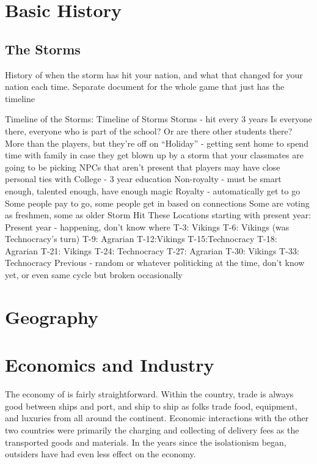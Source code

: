 \documentclass[blue]{GL2020}
\begin{document}
\name{\bVikings{}}

\section*{Basic History}

\subsection*{The Storms}
History of when the storm has hit your nation, and what that changed for your nation each time.
Separate document for the whole game that just has the timeline

Timeline of the Storms:
Timeline of Storms
Storms - hit every 3 years
Is everyone there, everyone who is part of the school?  Or are there other students there?
More than the players, but they’re off on “Holiday” - getting sent home to spend time with family in case they get blown up by a storm that your classmates are going to be picking
NPCs that aren’t present that players may have close personal ties with
College - 3 year education
Non-royalty - must be smart enough, talented enough, have enough magic
Royalty - automatically get to go
Some people pay to go, some people get in based on connections
Some are voting as freshmen, some as older
Storm Hit These Locations starting with present year:
Present year - happening, don’t know where
T-3: Vikings
T-6: Vikings (was Technocracy’s turn)
T-9: Agrarian
T-12:Vikings
T-15:Technocracy
T-18: Agrarian
T-21: Vikings
T-24: Technocracy
T-27: Agrarian
T-30: Vikings
T-33: Technocracy
Previous - random or whatever politicking at the time, don’t know yet, or even same cycle but broken occasionally


\section*{Geography}

\section*{Economics and Industry}
The economy of \pShip{} is fairly straightforward. Within the country, trade is always good between ships and port, and ship to ship as folks trade food, equipment, and luxuries from all around the continent. Economic interactions with the other two countries were primarily the charging and collecting of delivery fees as the \pShippies{} transported goods and materials. In the years since the isolationism began, outsiders have had even less effect on the economy.
\end{document}
